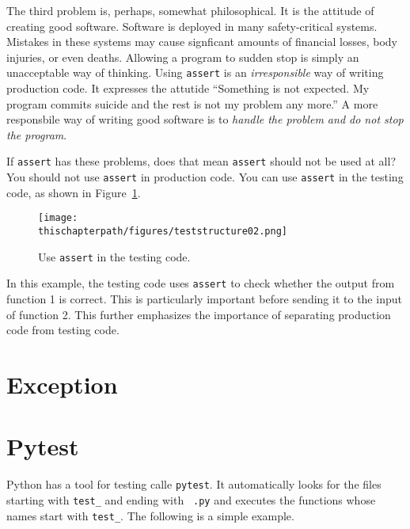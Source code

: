 
The third problem is, perhaps, somewhat philosophical.  It is the
attitude of creating good software.  Software is deployed in many
safety-critical systems. Mistakes in these systems may cause
signficant amounts of financial losses, body injuries, or even deaths.
Allowing a program to sudden stop is simply an unacceptable way of
thinking.  Using {\tt assert} is an {\it irresponsible} way of writing
production code.  It expresses the attutide ``Something is not
expected. My program commits suicide and the rest is not my problem
any more.''  A more responsbile way of writing good software is to
{\it handle the problem and do not stop the program}.

If {\tt assert} has these problems, does that mean {\tt assert} should
not be used at all?  You should not use {\tt assert} in production
code.  You can use {\tt assert} in the testing code, as shown in
Figure~\ref{fig:teststructure02}.


\begin{figure}[h] \centering
{\texttt{[image: \\thischapterpath/figures/teststructure02.png]}}
\caption{Use {\tt assert} in the testing code.}
\label{fig:teststructure02}
\end{figure}

In this example, the testing code uses {\tt assert} to check whether
the output from function 1 is correct.  This is particularly important
before sending it to the input of function 2.  This further emphasizes
the importance of separating production code from testing code.


\section{Exception}

\section{Pytest}

Python has a tool for testing calle {\tt pytest}. It automatically
looks for the files starting with {\tt test\_} and ending with {\tt
  .py} and executes the functions whose names start with {\tt test\_}.
The following is a simple example.


\resetlinenumber[1]
\linenumbers
\begin{tt}
  
\end{tt}
\nolinenumbers

